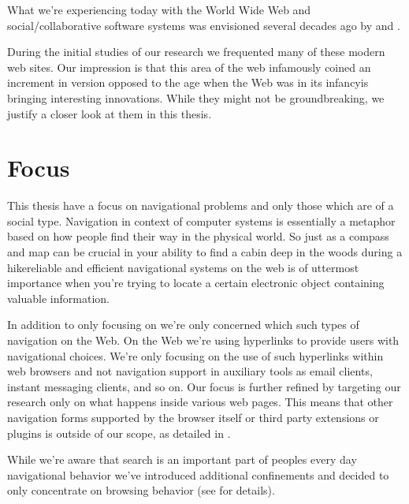What we're experiencing
today with the World Wide Web and social/collaborative software systems was
envisioned several decades ago by \citet{licklider68} and \citet{bush45}.

During the initial studies of our research we frequented
many of these modern web sites. Our impression is that
this area of the web infamously coined \dash{}an
increment in version opposed to the age when the Web was in its
infancy\dash{}is bringing interesting innovations. While they might not be
groundbreaking, we justify a closer look at them in this thesis.

\section{Focus}

This thesis have a focus on navigational problems and only those
which are of a social type.%
Navigation in context of computer systems is
essentially a metaphor based on how people find their way in the physical
world. So just as a compass and map can be crucial in your ability to find a
cabin deep in the woods during a hike\dash{}reliable and efficient
navigational systems on the web is of uttermost importance when you're trying
to locate a certain electronic object containing valuable information.

In addition to only focusing on  we're only concerned
which such types of navigation on the Web.
On the Web we're using hyperlinks \citep[]{nelson65} to provide users
with navigational choices. We're only focusing on the use of such hyperlinks
within web browsers and not navigation support in auxiliary tools as email
clients, instant messaging clients, and so on. Our focus is further refined by
targeting our research  only on what happens inside various web pages. This
means that other navigation forms supported by the browser itself or third
party extensions or plugins is outside of our scope, as detailed in
.

While we're aware that search is an important part of peoples every day
navigational behavior we've introduced additional confinements and decided to
only concentrate on browsing behavior (see
 for details).

